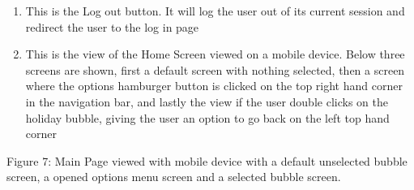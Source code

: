 \documentclass[hidelinks,english]{article}
\begin{document}
\begin{enumerate}
        \item This is the Log out button. It will log the user out of its current session and redirect the user to the log in page
        \item This is the view of the Home Screen viewed on a mobile device. Below three screens are shown, first a default screen with nothing selected, then a screen where the options hamburger button is clicked on the top right hand corner in the navigation bar, and lastly the view if the user double clicks on the holiday bubble, giving the user an option to go back on  the left top hand corner
    \end{enumerate}
    \begin{center}
      Figure 7: Main Page viewed with mobile device with a default unselected bubble screen, a opened options menu screen and a selected bubble screen.
      \label{mobile page}
    \end{center}
\end{document}
